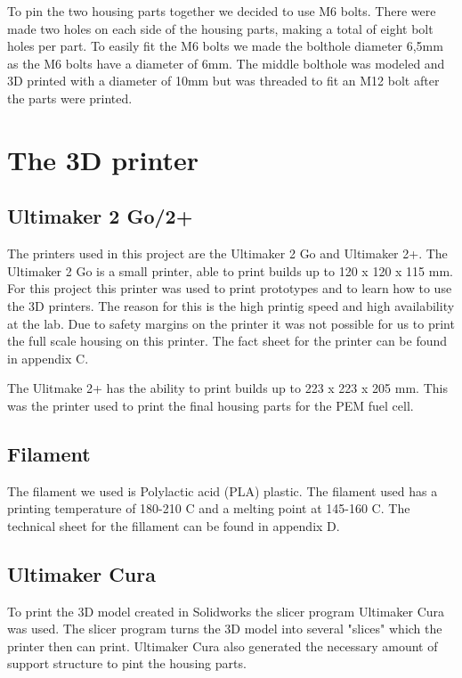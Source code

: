 To pin the two housing parts together we decided to use M6 bolts. There were made two holes on each side of the housing parts, making a total of eight bolt holes per part. To easily fit the M6 bolts we made the bolthole diameter 6,5mm as the M6 bolts have a diameter of 6mm. The middle bolthole was modeled and 3D printed with a diameter of 10mm but was threaded to fit an M12 bolt after the parts were printed. 

\section{The 3D printer}

\subsection{Ultimaker 2 Go/2+}

The printers used in this project are the Ultimaker 2 Go and Ultimaker 2+. The Ultimaker 2 Go is a small printer, able to print builds up to 120 x 120 x 115 mm. For this project this printer was used to print prototypes and to learn how to use the 3D printers. The reason for this is the high printig speed and high availability at the lab. Due to safety margins on the printer it was not possible for us to print the full scale housing on this printer. The fact sheet for the printer can be found in appendix C.

The Ulitmake 2+ has the ability to print builds up to 223 x 223 x 205 mm. This was the printer used to print the final housing parts for the PEM fuel cell. 

\subsection{Filament}

The filament we used is Polylactic acid (PLA) plastic. The filament used has a printing temperature of 180-210 \textdegree C and a melting point at 145-160 \textdegree C. The technical sheet for the fillament can be found in appendix D.

\subsection{Ultimaker Cura}

To print the 3D model created in Solidworks the slicer program Ultimaker Cura was used. The slicer program turns the 3D model into several "slices" which the printer then can print. Ultimaker Cura also generated the necessary amount of support structure to pint the housing parts. 


